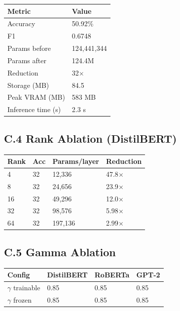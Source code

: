 \begin{table}[H]
\centering
\small
\begin{tabular}{ll}
\toprule
\textbf{Metric} & \textbf{Value} \\
\midrule
Accuracy & 50.92\% \\
F1 & 0.6748 \\
Params before & 124,441,344 \\
Params after & 124.4M \\
Reduction & 32$\times$ \\
Storage (MB) & 84.5 \\
Peak VRAM (MB) & 583 MB \\
Inference time (s) & 2.3 s \\
\bottomrule
\end{tabular}
\end{table}

\subsection{C.4 Rank Ablation (DistilBERT)}

\begin{table}[H]
\centering
\small
\begin{tabular}{llll}
\toprule
\textbf{Rank} & \textbf{Acc} & \textbf{Params/layer} & \textbf{Reduction} \\
\midrule
4 & 32 & 12,336 & 47.8$\times$ \\
8 & 32 & 24,656 & 23.9$\times$ \\
16 & 32 & 49,296 & 12.0$\times$ \\
32 & 32 & 98,576 & 5.98$\times$ \\
64 & 32 & 197,136 & 2.99$\times$ \\
\bottomrule
\end{tabular}
\end{table}

\subsection{C.5 Gamma Ablation}

\begin{table}[H]
\centering
\small
\begin{tabular}{llll}
\toprule
\textbf{Config} & \textbf{DistilBERT} & \textbf{RoBERTa} & \textbf{GPT-2} \\
\midrule
$\gamma$ trainable & 0.85 & 0.85 & 0.85 \\
$\gamma$ frozen & 0.85 & 0.85 & 0.85 \\
\bottomrule
\end{tabular}
\end{table}

